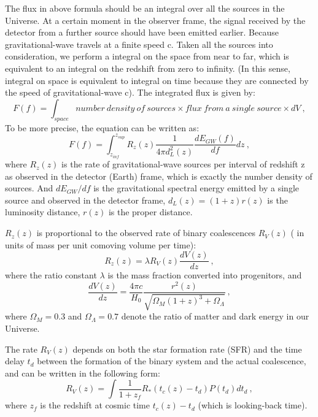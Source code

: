 \documentclass[11pt, a4paper]{article}
\begin{document}
The flux in above formula should be an integral over all the sources in the Universe. At a certain moment in the observer frame, the signal received by the detector from a further source should have been emitted earlier. Because gravitational-wave travels at a finite speed c. Taken all the sources into consideration, we perform a integral on the space from near to far, which is equivalent to an integral on the redshift from zero to infinity. (In this sense, integral on space is equivalent to integral on time because they are connected by the speed of gravitational-wave c). The integrated flux is given by:
\begin{equation}
F(f)=\int_{space} number~density~of~sources \times flux~from~a~single~source\times dV~,
\end{equation}
To be more precise, the equation can be written as:
\begin{equation}
F(f)=\int_{z_{inf}}^{z_{sup}}R_z(z)\frac{1}{4\pi d_L^2(z)}\frac{dE_{GW}(f)}{df}dz~,
\end{equation}
where $R_z(z)$ is the rate of gravitational-wave sources per interval of redshift z as observed in the detector (Earth) frame, which is exactly the number density of sources. And $dE_{GW}/{df}$ is the gravitational spectral energy emitted by a single source and observed in the detector frame, $d_L(z)=(1+z)r(z)$ is the luminosity distance, $r(z)$ is the proper distance. 

$R_z(z)$ is proportional to the observed rate of binary coalescences $R_V(z)$ ( in units of mass per unit comoving volume per time):
\begin{equation}
R_z(z)=\lambda R_V(z)\frac {dV(z)}{dz}~,
\end{equation}
where the ratio constant $\lambda$ is the mass fraction converted into progenitors, and
\begin{equation}
\frac{dV(z)}{dz}=\frac{4\pi c}{H_0} \frac{r^2(z)}{\sqrt {\Omega_M(1+z)^3+\Omega_\Lambda}}~,
\end{equation}
where $\Omega_M=0.3$ and $\Omega_\Lambda=0.7$ denote the ratio of matter and dark energy in our Universe.

The rate $R_V(z)$ depends on both the star formation rate (SFR) and the time delay $t_d$ between the formation of the binary system and the actual coalescence, and can be written in the following form:
\begin{equation}\label{int_sfr}
R_V(z)=\int \frac{1}{1+z_f} R_*(t_c(z)-t_d)P(t_d)dt_d~,
\end{equation}
where $z_f$ is the redshift at cosmic time $t_c(z)-t_d$ (which is looking-back time).
\end{document}
